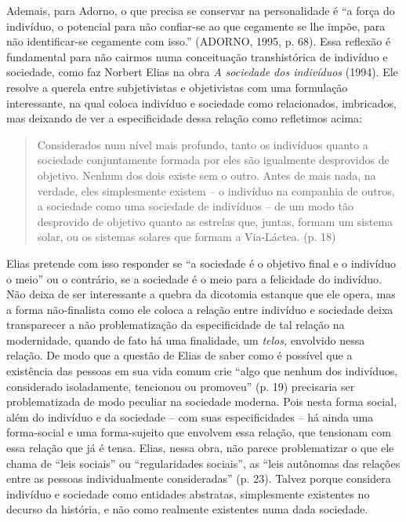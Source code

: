 Ademais, para Adorno, o que precisa se conservar na personalidade é ``a
força do indivíduo, o potencial para não confiar-se ao que cegamente se
lhe impõe, para não identificar-se cegamente com isso.'' (ADORNO, 1995,
p. 68). Essa reflexão é fundamental para não cairmos numa conceituação
transhistórica de indivíduo e sociedade, como faz Norbert Elias na obra
\emph{A sociedade dos indivíduos} (1994). Ele resolve a querela entre
subjetivistas e objetivistas com uma formulação interessante, na qual
coloca indivíduo e sociedade como relacionados, imbricados, mas deixando
de ver a especificidade dessa relação como refletimos acima:

\begin{quote}
Considerados num nível mais profundo, tanto os indivíduos quanto a
sociedade conjuntamente formada por eles são igualmente desprovidos de
objetivo. Nenhum dos dois existe sem o outro. Antes de mais nada, na
verdade, eles simplesmente existem -- o indivíduo na companhia de
outros, a sociedade como uma sociedade de indivíduos -- de um modo tão
desprovido de objetivo quanto as estrelas que, juntas, formam um sistema
solar, ou os sistemas solares que formam a Via-Láctea. (p. 18)
\end{quote}

Elias pretende com isso responder se ``a sociedade é o objetivo final e
o indivíduo o meio'' ou o contrário, se a sociedade é o meio para a
felicidade do indivíduo. Não deixa de ser interessante a quebra da
dicotomia estanque que ele opera, mas a forma não-finalista como ele
coloca a relação entre indivíduo e sociedade deixa transparecer a não
problematização da especificidade de tal relação na modernidade, quando
de fato há uma finalidade, um \emph{telos,} envolvido nessa relação. De
modo que a questão de Elias de saber como é possível que a existência
das pessoas em sua vida comum crie ``algo que nenhum dos indivíduos,
considerado isoladamente, tencionou ou promoveu'' (p. 19) precisaria ser
problematizada de modo peculiar na sociedade moderna. Pois nesta forma
social, além do indivíduo e da sociedade -- com suas especificidades --
há ainda uma forma-social e uma forma-sujeito que envolvem essa relação,
que tensionam com essa relação que já é tensa. Elias, nessa obra, não
parece problematizar o que ele chama de ``leis sociais'' ou
``regularidades sociais'', as ``leis autônomas das relações entre as
pessoas individualmente consideradas'' (p. 23). Talvez porque considera
indivíduo e sociedade como entidades abstratas, simplesmente existentes
no decurso da história, e não como realmente existentes numa dada
sociedade.

